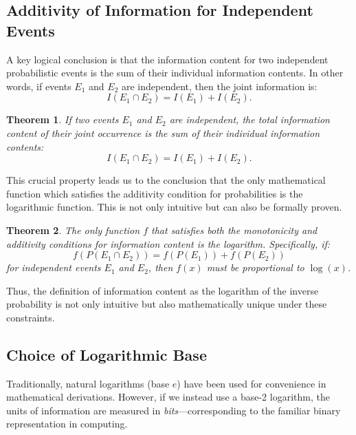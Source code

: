 \documentclass[12pt,a4paper]{article}
\newtheorem{theorem}{Theorem}[section]
\newenvironment{thmbox}[1][]{%
  \begin{tcolorbox}[enhanced, breakable, colback=thmcolor, colframe=blue!50!black, title=#1, fonttitle=\bfseries, arc=3pt, boxrule=0.5pt]
}{\end{tcolorbox}}
\begin{document}
\subsection{Additivity of Information for Independent Events}
A key logical conclusion is that the information content for two independent probabilistic events is the sum of their individual information contents. In other words, if events $E_1$ and $E_2$ are independent, then the joint information is:
\[
I(E_1 \cap E_2) = I(E_1) + I(E_2).
\]

\begin{thmbox}[Additivity of Information]
\begin{theorem}
If two events $E_1$ and $E_2$ are independent, the total information content of their joint occurrence is the sum of their individual information contents:
\[
I(E_1 \cap E_2) = I(E_1) + I(E_2).
\]
\end{theorem}
\end{thmbox}

This crucial property leads us to the conclusion that the only mathematical function which satisfies the additivity condition for probabilities is the logarithmic function. This is not only intuitive but can also be formally proven.

\begin{thmbox}[Uniqueness of the Logarithmic Form]
\begin{theorem}
The only function $f$ that satisfies both the monotonicity and additivity conditions for information content is the logarithm. Specifically, if:
\begin{equation}
f(P(E_1 \cap E_2)) = f(P(E_1)) + f(P(E_2))
\end{equation}
for independent events $E_1$ and $E_2$, then $f(x)$ must be proportional to $\log(x)$.
\end{theorem}
\end{thmbox}

Thus, the definition of information content as the logarithm of the inverse probability is not only intuitive but also mathematically unique under these constraints.

\subsection{Choice of Logarithmic Base}
Traditionally, natural logarithms (base $e$) have been used for convenience in mathematical derivations. However, if we instead use a base-2 logarithm, the units of information are measured in \textit{bits}—corresponding to the familiar binary representation in computing.
\end{document}
